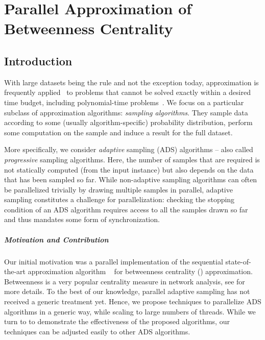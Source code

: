 \chapter{Parallel Approximation of Betweenness Centrality}
\label{ch:betweenness-approx}

\section{Introduction}
%
With large datasets being the rule and not the exception today, approximation
is frequently applied~\cite{DBLP:books/tf/18/2018aam-1} to problems that cannot be
solved exactly within a desired time budget, including polynomial-time
problems~\cite{DBLP:conf/esa/BorassiN16}. We focus on a particular subclass of
approximation algorithms: \emph{sampling algorithms}. They sample data
according to some (usually algorithm-specific) probability distribution,
perform some computation on the sample and induce a result for the full
dataset.

More specifically, we consider \emph{adaptive} sampling (ADS) algorithms --
also called \emph{progressive} sampling algorithms. Here, the number of samples
that are required is not statically computed (\eg from the input instance) but
also depends on the data that has been sampled so far. While non-adaptive
sampling algorithms can often be parallelized trivially by drawing multiple
samples in parallel, adaptive sampling constitutes a challenge for
parallelization: checking the stopping condition of an ADS algorithm requires
access to all the samples drawn so far and thus mandates some form of
synchronization.


\paragraph{Motivation and Contribution}
%
Our initial motivation was a parallel implementation of the sequential
state-of-the-art approximation algorithm \kadabra~\cite{DBLP:conf/esa/BorassiN16} for
betweenness centrality (\betw) approximation. Betweenness is a very popular
centrality measure in network analysis, see
 for more details.
To the best of our knowledge, parallel adaptive sampling has not received a
generic treatment yet. Hence, we propose techniques to parallelize ADS
algorithms in a generic way, while scaling to large numbers of threads.
%
While we turn to \kadabra to demonstrate the effectiveness of the proposed
algorithms, our techniques can be adjusted easily to other ADS algorithms.

